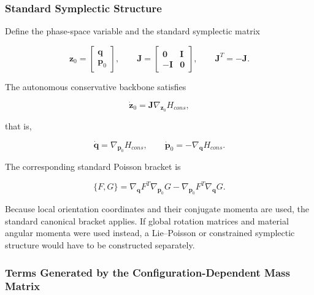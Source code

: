 \subsubsection{Standard Symplectic Structure}\label{sec:hamiltonian-3-3-1}

Define the phase-space variable and the standard symplectic matrix

\begin{equation}
\label{eq:hamiltonian-3-18}
\mathbf{z}_{0} = \begin{bmatrix}
\mathbf{q} \\
\mathbf{p}_{0}
\end{bmatrix},\quad\quad\mathbf{J} = \begin{bmatrix}
\mathbf{0} & \mathbf{I} \\
 - \mathbf{I} & \mathbf{0}
\end{bmatrix},\quad\quad\mathbf{J}^{T} = - \mathbf{J}.
\end{equation}

The autonomous conservative backbone satisfies

\begin{equation}
\label{eq:hamiltonian-3-19}
\boxed{{\dot{\mathbf{z}}}_{0} = \mathbf{J}\nabla_{\mathbf{z}_{0}}H_{cons},}
\end{equation}

that is,

\begin{equation}
\label{eq:hamiltonian-3-20}
\boxed{\dot{\mathbf{q}} = \nabla_{\mathbf{p}_{0}}H_{cons},\quad\quad{\dot{\mathbf{p}}}_{0} = - \nabla_{\mathbf{q}}H_{cons}.}
\end{equation}

The corresponding standard Poisson bracket is

\begin{equation}
\label{eq:hamiltonian-3-21}
\{ F,G\} = \nabla_{\mathbf{q}}F^{T}\nabla_{\mathbf{p}_{0}}G - \nabla_{\mathbf{p}_{0}}F^{T}\nabla_{\mathbf{q}}G.
\end{equation}

Because local orientation coordinates and their conjugate momenta are used, the standard canonical bracket applies. If global rotation matrices and material angular momenta were used instead, a Lie--Poisson or constrained symplectic structure would have to be constructed separately.

\subsubsection{Terms Generated by the Configuration-Dependent Mass Matrix}\label{sec:hamiltonian-3-3-2}


